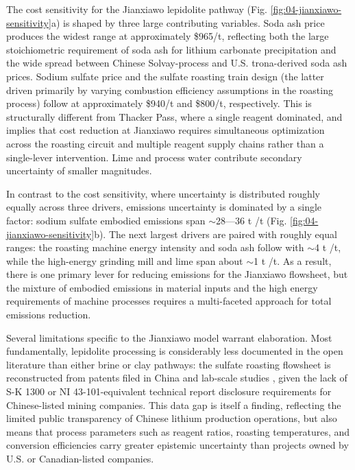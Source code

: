 \documentclass{article}
\renewcommand\_{\textunderscore\allowbreak}
\begin{document}
The cost sensitivity for the Jianxiawo lepidolite pathway (Fig. \ref{fig:04-jianxiawo-sensitivity}a) is shaped by three large contributing variables. Soda ash price produces the widest range at approximately \$965/t, reflecting both the large stoichiometric requirement of soda ash for lithium carbonate precipitation and the wide spread between Chinese Solvay-process and U.S. trona-derived soda ash prices. Sodium sulfate price and the sulfate roasting train design (the latter driven primarily by varying combustion efficiency assumptions in the roasting process) follow at approximately \$940/t and \$800/t, respectively. This is structurally different from Thacker Pass, where a single reagent dominated, and implies that cost reduction at Jianxiawo requires simultaneous optimization across the roasting circuit and multiple reagent supply chains rather than a single-lever intervention. Lime and process water contribute secondary uncertainty of smaller magnitudes. 

In contrast to the cost sensitivity, where uncertainty is distributed roughly equally across three drivers, emissions uncertainty is dominated by a single factor: sodium sulfate embodied emissions span $\sim$28---36 t /t  (Fig. \ref{fig:04-jianxiawo-sensitivity}b). The next largest drivers are paired with roughly equal ranges: the roasting machine energy intensity and soda ash follow with $\sim$4 t /t, while the high-energy grinding mill and lime span about $\sim$1 t /t. As a result, there is one primary lever for reducing emissions for the Jianxiawo flowsheet, but the mixture of embodied emissions in material inputs and the high energy requirements of machine processes requires a multi-faceted approach for total emissions reduction. 

Several limitations specific to the Jianxiawo model warrant elaboration. Most fundamentally, lepidolite processing is considerably less documented in the open literature than either brine or clay pathways: the sulfate roasting flowsheet is reconstructed from patents filed in China and lab-scale studies \cite{yanExtractionLithiumLepidolite2012, luongFactorsAffectingExtraction2013, parkEffectiveLithiumExtraction2023, dengSystematicReviewSulfate2026, nanMethodsExtractingLithium2022, nanMethodsExtractingLithium2019, zouMethodEfficientLithium2024}, given the lack of S-K 1300 or NI 43-101-equivalent technical report disclosure requirements for Chinese-listed mining companies. This data gap is itself a finding, reflecting the limited public transparency of Chinese lithium production operations, but also means that process parameters such as reagent ratios, roasting temperatures, and conversion efficiencies carry greater epistemic uncertainty than projects owned by U.S. or Canadian-listed companies. 
\end{document}
